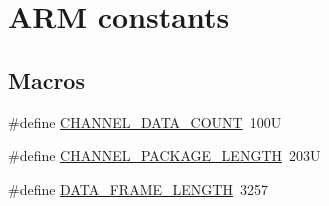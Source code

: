 \hypertarget{group___a_r_m_const}{\section{A\-R\-M constants}
\label{group___a_r_m_const}
}
\subsection*{Macros}
\begin{DoxyCompactItemize}
\item 
\#define \hyperlink{group___a_r_m_const_ga50e0cf6a0eda6888a94b16f97f149d01}{C\-H\-A\-N\-N\-E\-L\-\_\-\-D\-A\-T\-A\-\_\-\-C\-O\-U\-N\-T}~100\-U
\item 
\#define \hyperlink{group___a_r_m_const_gab65286a9232a564c392196519e2ab6ba}{C\-H\-A\-N\-N\-E\-L\-\_\-\-P\-A\-C\-K\-A\-G\-E\-\_\-\-L\-E\-N\-G\-T\-H}~203\-U
\item 
\#define \hyperlink{group___a_r_m_const_gabb5ec28e1c20e234410dc0f24de7d735}{D\-A\-T\-A\-\_\-\-F\-R\-A\-M\-E\-\_\-\-L\-E\-N\-G\-T\-H}~3257
\end{DoxyCompactItemize}
